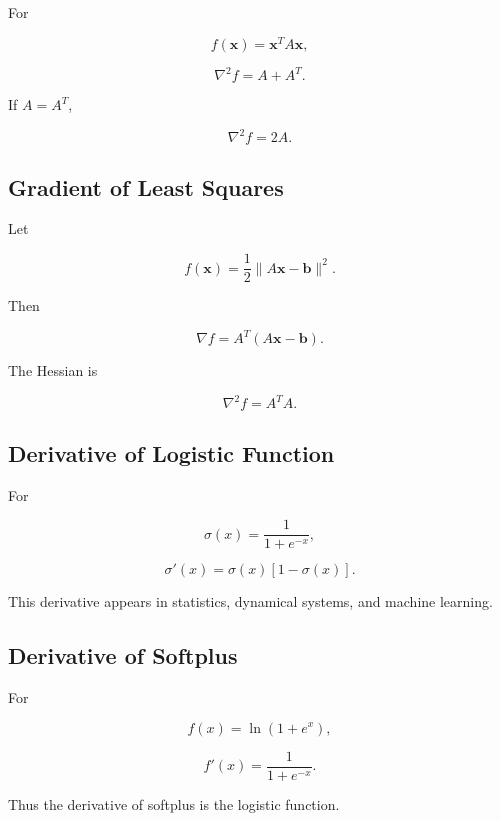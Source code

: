 For

\[
f(\mathbf{x})
=
\mathbf{x}^TA\mathbf{x},
\]

\[
\boxed{
\nabla^2f
=
A+A^T.
}
\]

If \(A=A^T\),

\[
\boxed{
\nabla^2f
=
2A.
}
\]

\subsection{Gradient of Least Squares}
\label{subsec:gradient-least-squares}

Let

\[
f(\mathbf{x})
=
\frac12
\|A\mathbf{x}-\mathbf{b}\|^2.
\]

Then

\[
\boxed{
\nabla f
=
A^T
(A\mathbf{x}-\mathbf{b}).
}
\]

The Hessian is

\[
\boxed{
\nabla^2f
=
A^TA.
}
\]

\subsection{Derivative of Logistic Function}
\label{subsec:logistic-derivative-reference}

For

\[
\sigma(x)
=
\frac{1}{1+e^{-x}},
\]

\[
\boxed{
\sigma'(x)
=
\sigma(x)
[1-\sigma(x)].
}
\]

This derivative appears in statistics, dynamical systems, and machine
learning.

\subsection{Derivative of Softplus}
\label{subsec:softplus-derivative}

For

\[
f(x)
=
\ln(1+e^x),
\]

\[
\boxed{
f'(x)
=
\frac{1}{1+e^{-x}}.
}
\]

Thus the derivative of softplus is the logistic function.

